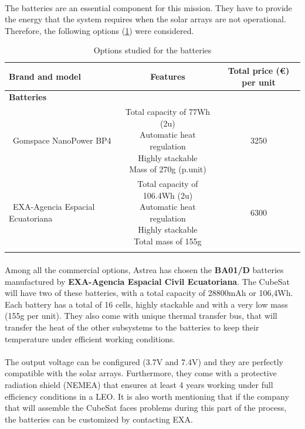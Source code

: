 \paragraph{}	The batteries are an essential component for this mission. They have to provide the energy that the system requires when the solar arrays are not operational. Therefore, the following options (\ref{optionsbatteries}) were considered.

\begin{longtable}{| l | c | c | }
\hline
\rowcolor[gray]{0.80}	\textbf{Brand and model} &  \textbf{Features}     & \textbf{Total price (\euro) per unit}   \\
\hline
\endfirsthead
\rowcolor[gray]{0.85} \textbf{Batteries} &  &  \\
	   ~Gomspace NanoPower BP4 & \makecell{Total capacity of 77Wh (2u) \\ Automatic heat regulation \\ Highly stackable \\ Mass of 270g (p.unit)} & 3250 \\
	\hline
	~EXA-Agencia Espacial Ecuatoriana & \makecell{Total capacity of 106.4Wh (2u)\\ Automatic heat regulation \\ Highly stackable \\ Total mass of 155g} & 6300 \\
	\hline
	
\caption{Options studied for the batteries}
\label{optionsbatteries}
\end{longtable}

\paragraph{}Among all the commercial options, Astrea has chosen the \textbf{BA01/D} batteries manufactured by \textbf{EXA-Agencia Espacial Civil Ecuatoriana}. The CubeSat will have two of these batteries, with a total capacity of 28800mAh or 106,4Wh. Each battery has a total of 16 cells, highly stackable and with a very low mass (155g per unit). They also come with unique thermal transfer bus, that will transfer the heat of the other subsystems to the batteries to keep their temperature under efficient working conditions.

\paragraph{}The output voltage can be configured (3.7V and 7.4V) and they are perfectly compatible with the solar arrays. Furthermore, they come with a protective radiation shield (NEMEA) that ensures at least 4 years working under full efficiency conditions in a LEO. It is also worth mentioning that if the company that will assemble the CubeSat faces problems during this part of the process, the batteries can be customized by contacting EXA.

